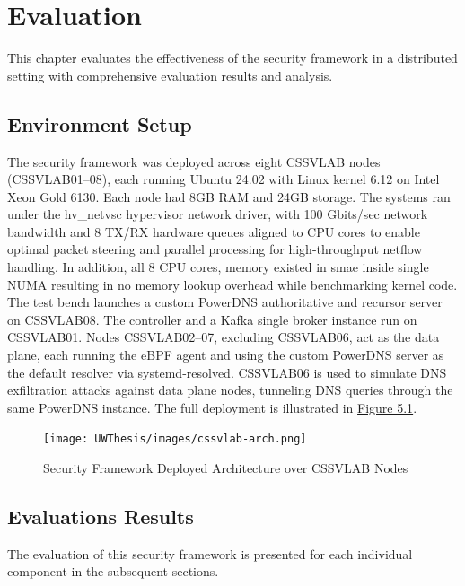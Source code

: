 \documentclass [11pt, proquest] {uwthesis}[2020/02/24]
\begin{document}





\chapter{Evaluation}
This chapter evaluates the effectiveness of the security framework in a distributed setting with  comprehensive evaluation results and analysis.


\section{Environment Setup}
The security framework was deployed across eight CSSVLAB nodes (CSSVLAB{01–08}), each running Ubuntu 24.02 with Linux kernel 6.12 on Intel Xeon Gold 6130. Each node had 8GB RAM and 24GB storage. The systems ran under the hv\_netvsc hypervisor network driver, with 100 Gbits/sec network bandwidth and 8 TX/RX hardware queues aligned to CPU cores to enable optimal packet steering and parallel processing for high-throughput netflow handling. In addition, all 8 CPU cores, memory existed in smae inside single NUMA resulting in no memory lookup overhead while benchmarking kernel code. The test bench launches a custom PowerDNS authoritative and recursor server on CSSVLAB08. The controller and a Kafka single broker instance run on CSSVLAB01. Nodes CSSVLAB{02–07}, excluding CSSVLAB06, act as the data plane, each running the eBPF agent and using the custom PowerDNS server as the default resolver via systemd-resolved. CSSVLAB06 is used to simulate DNS exfiltration attacks against data plane nodes, tunneling DNS queries through the same PowerDNS instance. The full deployment is illustrated in \hyperref[sec:deployed-arch]{Figure 5.1}.


\begin{figure}[h]
\centering
\texttt{[image: UWThesis/images/cssvlab-arch.png]}
\caption{Security Framework Deployed Architecture over CSSVLAB Nodes}
\label{sec:deployed-arch}
\end{figure}


\section{Evaluations Results}
The evaluation of this security framework is presented for each individual component in the subsequent sections.
\end{document}
